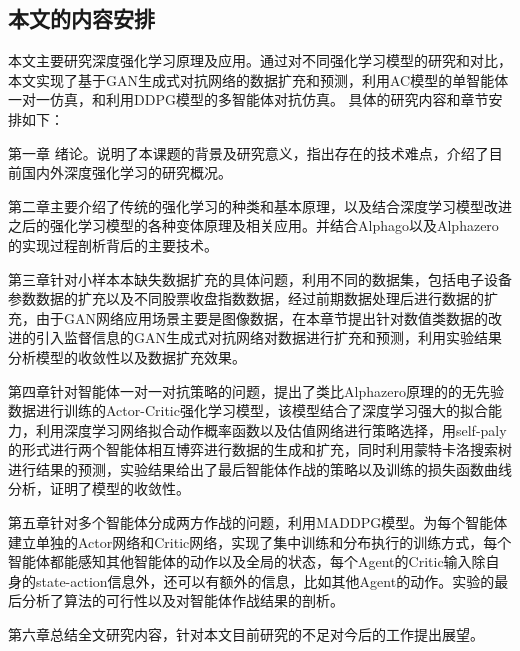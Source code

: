 \subsection{本文的内容安排}
本文主要研究深度强化学习原理及应用。通过对不同强化学习模型的研究和对比，本文实现了基于GAN生成式对抗网络的数据扩充和预测，利用AC模型的单智能体一对一仿真，和利用DDPG模型的多智能体对抗仿真。
具体的研究内容和章节安排如下：

第一章 绪论。说明了本课题的背景及研究意义，指出存在的技术难点，介绍了目前国内外深度强化学习的研究概况。

第二章主要介绍了传统的强化学习的种类和基本原理，以及结合深度学习模型改进之后的强化学习模型的各种变体原理及相关应用。并结合Alphago以及Alphazero的实现过程剖析背后的主要技术。

第三章针对小样本本缺失数据扩充的具体问题，利用不同的数据集，包括电子设备参数数据的扩充以及不同股票收盘指数数据，经过前期数据处理后进行数据的扩充，由于GAN网络应用场景主要是图像数据，在本章节提出针对数值类数据的改进的引入监督信息的GAN生成式对抗网络对数据进行扩充和预测，利用实验结果分析模型的收敛性以及数据扩充效果。

第四章针对智能体一对一对抗策略的问题，提出了类比Alphazero原理的的无先验数据进行训练的Actor-Critic强化学习模型，该模型结合了深度学习强大的拟合能力，利用深度学习网络拟合动作概率函数以及估值网络进行策略选择，用self-paly的形式进行两个智能体相互博弈进行数据的生成和扩充，同时利用蒙特卡洛搜索树进行结果的预测，实验结果给出了最后智能体作战的策略以及训练的损失函数曲线分析，证明了模型的收敛性。

第五章针对多个智能体分成两方作战的问题，利用MADDPG模型。为每个智能体建立单独的Actor网络和Critic网络，实现了集中训练和分布执行的训练方式，每个智能体都能感知其他智能体的动作以及全局的状态，每个Agent的Critic输入除自身的state-action信息外，还可以有额外的信息，比如其他Agent的动作。实验的最后分析了算法的可行性以及对智能体作战结果的剖析。



第六章总结全文研究内容，针对本文目前研究的不足对今后的工作提出展望。
